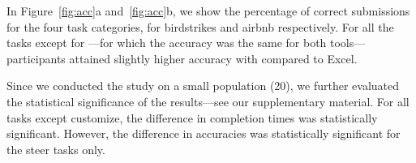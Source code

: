  In Figure~\ref{fig:acc}a and~\ref{fig:acc}b, 
we show the percentage of correct submissions for the four task categories, 
for birdstrikes and airbnb respectively. 
For all the tasks except for \cmpA---for which the accuracy
was the same for both tools---participants 
attained slightly higher accuracy
with \noah compared to Excel. 

Since we conducted the study 
on a small population (20), 
we further evaluated the statistical significance of the results---see our supplementary material.
For all tasks except customize, the difference in completion times was statistically significant. 
However, the difference in accuracies was statistically significant 
for the steer tasks only. 


